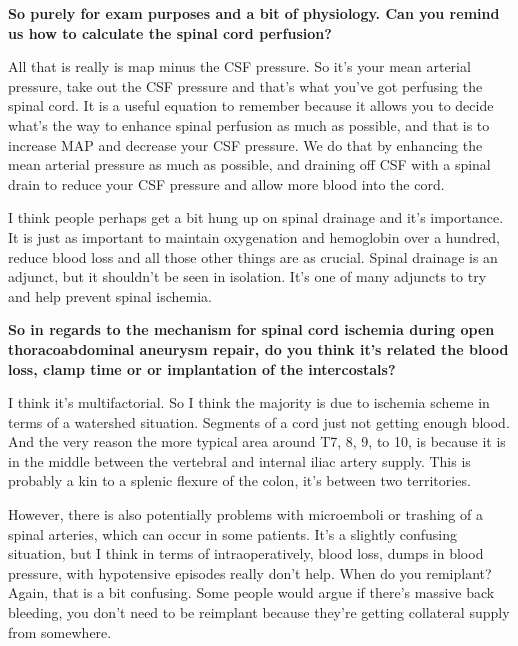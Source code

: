 \documentclass[
]{book}
\begin{document}
\textbf{So purely for exam purposes and a bit of physiology. Can you remind us
how to calculate the spinal cord perfusion?}

All that is really is map minus the CSF pressure. So it's your mean
arterial pressure, take out the CSF pressure and that's what you've got
perfusing the spinal cord. It is a useful equation to remember because
it allows you to decide what's the way to enhance spinal perfusion as
much as possible, and that is to increase MAP and decrease your CSF
pressure. We do that by enhancing the mean arterial pressure as much as
possible, and draining off CSF with a spinal drain to reduce your CSF
pressure and allow more blood into the cord.

I think people perhaps get a bit hung up on spinal drainage and it's
importance. It is just as important to maintain oxygenation and
hemoglobin over a hundred, reduce blood loss and all those other things
are as crucial. Spinal drainage is an adjunct, but it shouldn't be seen
in isolation. It's one of many adjuncts to try and help prevent spinal
ischemia.

\textbf{So in regards to the mechanism for spinal cord ischemia during open
thoracoabdominal aneurysm repair, do you think it's related the blood
loss, clamp time or or implantation of the intercostals?}

I think it's multifactorial. So I think the majority is due to ischemia
scheme in terms of a watershed situation. Segments of a cord just not
getting enough blood. And the very reason the more typical area around
T7, 8, 9, to 10, is because it is in the middle between the vertebral
and internal iliac artery supply. This is probably a kin to a splenic
flexure of the colon, it's between two territories.

However, there is also potentially problems with microemboli or trashing
of a spinal arteries, which can occur in some patients. It's a slightly
confusing situation, but I think in terms of intraoperatively, blood
loss, dumps in blood pressure, with hypotensive episodes really don't
help. When do you remiplant? Again, that is a bit confusing. Some people
would argue if there's massive back bleeding, you don't need to be
reimplant because they're getting collateral supply from somewhere.
\end{document}

